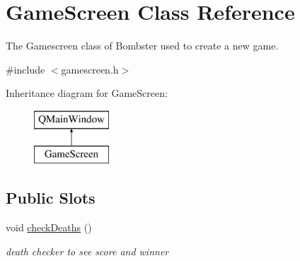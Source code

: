 \hypertarget{class_game_screen}{\section{Game\-Screen Class Reference}
\label{class_game_screen}
}


The Gamescreen class of Bombster used to create a new game.  




{\ttfamily \#include $<$gamescreen.\-h$>$}

Inheritance diagram for Game\-Screen\-:\begin{figure}[H]
\begin{center}
\leavevmode
\includegraphics[height=2.000000cm]{class_game_screen}
\end{center}
\end{figure}
\subsection*{Public Slots}
\begin{DoxyCompactItemize}
\item 
void \hyperlink{class_game_screen_acc6c827cf1996a4385299b3f736f8db9}{check\-Deaths} ()
\begin{DoxyCompactList}\small\item\em death checker to see score and winner \end{DoxyCompactList}\end{DoxyCompactItemize}
